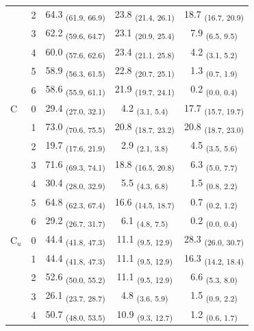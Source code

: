 \begin{table}[h!]
\begin{tabular}{ll ccc}
 & 2 & 64.3 \textsubscript{(61.9, 66.9)} & 23.8 \textsubscript{(21.4, 26.1)} & 18.7 \textsubscript{(16.7, 20.9)} \\
 & 3 & 62.2 \textsubscript{(59.6, 64.7)} & 23.1 \textsubscript{(20.9, 25.4)} & 7.9 \textsubscript{(6.5, 9.5)} \\
 & 4 & 60.0 \textsubscript{(57.6, 62.6)} & 23.4 \textsubscript{(21.1, 25.8)} & 4.2 \textsubscript{(3.1, 5.2)} \\
 & 5 & 58.9 \textsubscript{(56.3, 61.5)} & 22.8 \textsubscript{(20.7, 25.1)} & 1.3 \textsubscript{(0.7, 1.9)} \\
 & 6 & 58.6 \textsubscript{(55.9, 61.1)} & 21.9 \textsubscript{(19.7, 24.1)} & 0.2 \textsubscript{(0.0, 0.4)} \\
\midrule
C & 0 & 29.4 \textsubscript{(27.0, 32.1)} & 4.2 \textsubscript{(3.1, 5.4)} & 17.7 \textsubscript{(15.7, 19.7)} \\
 & 1 & 73.0 \textsubscript{(70.6, 75.5)} & 20.8 \textsubscript{(18.7, 23.2)} & 20.8 \textsubscript{(18.7, 23.0)} \\
 & 2 & 19.7 \textsubscript{(17.6, 21.9)} & 2.9 \textsubscript{(2.1, 3.8)} & 4.5 \textsubscript{(3.5, 5.6)} \\
 & 3 & 71.6 \textsubscript{(69.3, 74.1)} & 18.8 \textsubscript{(16.5, 20.8)} & 6.3 \textsubscript{(5.0, 7.7)} \\
 & 4 & 30.4 \textsubscript{(28.0, 32.9)} & 5.5 \textsubscript{(4.3, 6.8)} & 1.5 \textsubscript{(0.8, 2.2)} \\
 & 5 & 64.8 \textsubscript{(62.3, 67.4)} & 16.6 \textsubscript{(14.5, 18.7)} & 0.7 \textsubscript{(0.2, 1.2)} \\
 & 6 & 29.2 \textsubscript{(26.7, 31.7)} & 6.1 \textsubscript{(4.8, 7.5)} & 0.2 \textsubscript{(0.0, 0.4)} \\
\midrule
C$_u$ & 0 & 44.4 \textsubscript{(41.8, 47.3)} & 11.1 \textsubscript{(9.5, 12.9)} & 28.3 \textsubscript{(26.0, 30.7)} \\
 & 1 & 44.4 \textsubscript{(41.8, 47.3)} & 11.1 \textsubscript{(9.5, 12.9)} & 16.3 \textsubscript{(14.2, 18.4)} \\
 & 2 & 52.6 \textsubscript{(50.0, 55.2)} & 11.1 \textsubscript{(9.5, 12.9)} & 6.6 \textsubscript{(5.3, 8.0)} \\
 & 3 & 26.1 \textsubscript{(23.7, 28.7)} & 4.8 \textsubscript{(3.6, 5.9)} & 1.5 \textsubscript{(0.9, 2.2)} \\
 & 4 & 50.7 \textsubscript{(48.0, 53.5)} & 10.9 \textsubscript{(9.3, 12.7)} & 1.2 \textsubscript{(0.6, 1.7)} \\

\end{tabular}
\end{table}
